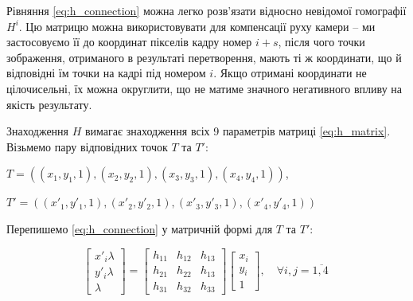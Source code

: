 Рівняння \ref{eq:h_connection} можна легко розв'язати відносно невідомої гомографії
\(H^{i}\). Цю матрицю можна використовувати для компенсації руху камери
-- ми застосовуємо її до координат пікселів кадру номер \(i + s\), після
чого точки зображення, отриманого в результаті перетворення, мають ті ж
координати, що й відповідні їм точки на кадрі під номером \(i\). Якщо
отримані координати не цілочисельні, їх можна округлити, що не матиме
значного негативного впливу на якість результату.

Знаходження $H$ вимагає знаходження всіх 9 параметрів матриці \ref{eq:h_matrix}.
Візьмемо пару відповідних точок $T$ та $T'$:


$T = ((x_1,y_1,1), (x_2,y_2,1), (x_3,y_3,1), (x_4,y_4,1))$, 


$T' = ((x'_1,y'_1,1), (x'_2,y'_2,1), (x'_3,y'_3,1), (x'_4,y'_4,1))$ 

Перепишемо \ref{eq:h_connection} у матричній формі для $T$ та $T'$:

\begin{equation}
    \begin{bmatrix}
        x'_i\lambda\\
        y'_i\lambda\\
        \lambda
    \end{bmatrix} 
    = 
    \begin{bmatrix}
        h_{11} & h_{12} & h_{13}\\
        h_{21} & h_{22} & h_{13}\\
        h_{31} & h_{32} & h_{33}
    \end{bmatrix}
    \begin{bmatrix}
        x_i\\
        y_i\\
        1
    \end{bmatrix}
    ,\quad\forall i,j = \overline{1,4\ }
    \label{eq:h_connection2}
\end{equation}

